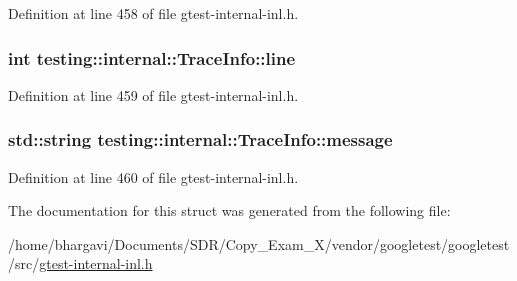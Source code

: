 Definition at line 458 of file gtest-\/internal-\/inl.\+h.

\subsubsection[{\texorpdfstring{line}{line}}]{\setlength{\rightskip}{0pt plus 5cm}int testing\+::internal\+::\+Trace\+Info\+::line}\hypertarget{structtesting_1_1internal_1_1_trace_info_ae9d269de1b77f4a3180d0d34acb4d7ff}{}\label{structtesting_1_1internal_1_1_trace_info_ae9d269de1b77f4a3180d0d34acb4d7ff}


Definition at line 459 of file gtest-\/internal-\/inl.\+h.

\subsubsection[{\texorpdfstring{message}{message}}]{\setlength{\rightskip}{0pt plus 5cm}std\+::string testing\+::internal\+::\+Trace\+Info\+::message}\hypertarget{structtesting_1_1internal_1_1_trace_info_a39e74f39ce6d5fdbac799abdb1c27f90}{}\label{structtesting_1_1internal_1_1_trace_info_a39e74f39ce6d5fdbac799abdb1c27f90}


Definition at line 460 of file gtest-\/internal-\/inl.\+h.



The documentation for this struct was generated from the following file\+:\begin{DoxyCompactItemize}
\item 
/home/bhargavi/\+Documents/\+S\+D\+R/\+Copy\+\_\+\+Exam\+\_\+X/vendor/googletest/googletest/src/\hyperlink{gtest-internal-inl_8h}{gtest-\/internal-\/inl.\+h}\end{DoxyCompactItemize}
